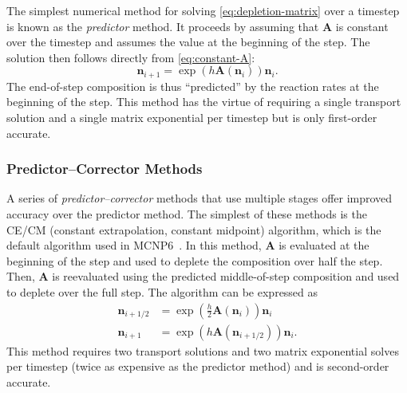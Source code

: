 \documentclass[3p,authoryear]{elsarticle}
\newcommand{\vect}[1]{\mathbf{#1}} %
\begin{document}
The simplest numerical method for solving \cref{eq:depletion-matrix} over a
timestep is known as the \emph{predictor} method. It proceeds by assuming that
$\vect{A}$ is constant over the timestep and assumes the value at the
beginning of the step. The solution then follows directly from
\cref{eq:constant-A}:
\begin{equation}
  \label{eq:predictor}
  \vect{n}_{i+1} = \exp\left(h\vect{A}(\vect{n}_i) \right) \vect{n}_i.
\end{equation}
The end-of-step composition is thus ``predicted'' by the reaction rates at the
beginning of the step. This method has the virtue of requiring a single
transport solution and a single matrix exponential per timestep but is only
first-order accurate.

\subsubsection{Predictor--Corrector Methods}

A series of \emph{predictor--corrector} methods that use multiple stages offer
improved accuracy over the predictor method. The simplest of these methods is
the CE/CM (constant extrapolation, constant midpoint) algorithm, which is the
default algorithm used in MCNP6~\citep{fensin2006tans}. In this method,
$\vect{A}$ is evaluated at the beginning of the step and used to deplete the
composition over half the step. Then, $\vect{A}$ is reevaluated using the
predicted middle-of-step composition and used to deplete over the full step. The
algorithm can be expressed as
\begin{equation}
  \begin{split}
    \vect{n}_{i+1/2} &= \exp \left (\frac{h}{2}\vect{A}(\vect{n}_i) \right) \vect{n}_i \\
    \vect{n}_{i+1} &= \exp \left(h \vect{A}(\vect{n}_{i+1/2}) \right) \vect{n}_i.
  \end{split}
\end{equation}
This method requires two transport solutions and two matrix exponential solves
per timestep (twice as expensive as the predictor method) and is second-order
accurate.
\end{document}
